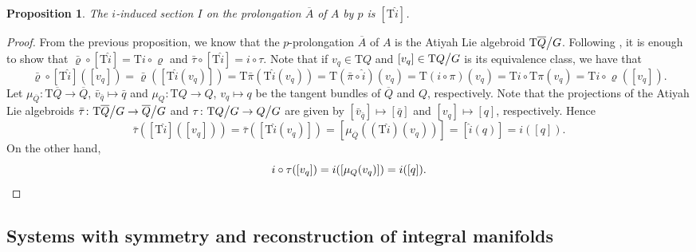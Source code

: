 \documentclass[11pt]{article}
\theoremstyle{plain}
\newtheorem{proposition}{Proposition}
\theoremstyle{definition}
\begin{document}
\begin{proposition} \label{prop:inducedsectionAtiyah} The $i$-induced section $I$ on the prolongation $\overline A$ of $A$ by $p$ is  $[\mathrm{T}\hat{i}]$.
\end{proposition}
\begin{proof} 
From the previous proposition, we know that the $p$-prolongation $\overline A$ of $A$ is the Atiyah Lie algebroid $\mathrm{T}\overline Q\big\slash G$.
Following , it is enough to show that  $\bar{\varrho}\circ [\mathrm{T}\hat{i}]=\mathrm{T}i\circ \varrho$ and $\bar{\tau}\circ [\mathrm{T}\hat{i}]=i\circ \tau$. Note that if $v_q\in \mathrm{T}Q$ and $[v_q]\in \mathrm{T}Q\big\slash G$ is its equivalence class, we have that
\begin{equation*}
    \bar{\varrho}\circ [\mathrm{T}\hat{i}]([v_q])=\bar{\varrho}([\mathrm{T}\hat{i}(v_q)])=\mathrm{T}\bar{\pi}(\mathrm{T}\hat{i}(v_q))=\mathrm{T}(\bar{\pi}\circ \hat{i})(v_q)=\mathrm{T}(i\circ \pi)(v_q)=\mathrm{T}i\circ \mathrm{T}\pi(v_q)=\mathrm{T}i\circ \varrho([v_q]).
\end{equation*}
Let $\mu_{\overline Q}\colon \mathrm{T}\overline Q\to \overline Q$, $\bar{v}_{\bar{q}}\mapsto \bar{q}$ and $\mu_Q\colon \mathrm{T}Q\to Q$, $v_q\mapsto q$ be the tangent bundles of ${\overline Q}$ and $Q$, respectively. Note that the projections of the Atiyah Lie algebroids $\bar{\tau}\colon \mathrm{T}\overline Q\big\slash G\to \overline Q\big\slash G$ and $\tau\colon \mathrm{T}Q\big\slash G\to {Q\big\slash G}$ are given by $[\bar{v}_{\bar q}]\mapsto [\bar q]$ and $[v_q]\mapsto [q]$, respectively. Hence
\begin{equation*}
    \bar{\tau}([\mathrm{T}\hat{i}]([v_q]))=\bar{\tau}([\mathrm{T}\hat{i}(v_q)])=[\mu_{\overline Q}((\mathrm{T}\hat{i})(v_q))]=[\hat{i}(q)]=i([q]).
\end{equation*}
On the other hand,
\begin{equation*}
    i\circ \tau([v_q])=i([\mu_{Q}(v_q)])=i([q]).\qedhere
\end{equation*}
\end{proof}

\subsection{Systems with symmetry and reconstruction of integral manifolds}
\end{document}
